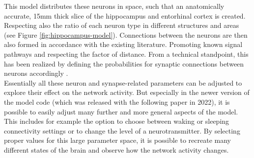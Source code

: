     This model distributes these neurons in space, such that an anatomically accurate, 15mm thick slice of the hippocampus and entorhinal cortex is created. Respecting also the ratio of each neuron type in different structures and areas (see Figure \ref{fig:hippocampus-model}). Connections between the neurons are then also formed in accordance with the existing literature. Promoting known signal pathways and respecting the factor of distance. From a technical standpoint, this has been realized by defining the probabilities for synaptic connections between neurons accordingly \cite{Aussel.2018}.\\
    Essentially all these neuron and synapse-related parameters can be adjusted to explore their effect on the network activity. But especially in the newer version of the model code \cite{HippSimModel.2} (which was released with the following paper \cite{Aussel.2022} in 2022), it is possible to easily adjust many further and more general aspects of the model. This includes for example the option to choose between waking or sleeping connectivity settings or to change the level of a neurotransmitter. By selecting proper values for this large parameter space, it is possible to recreate many different states of the brain and observe how the network activity changes. 
    
        
